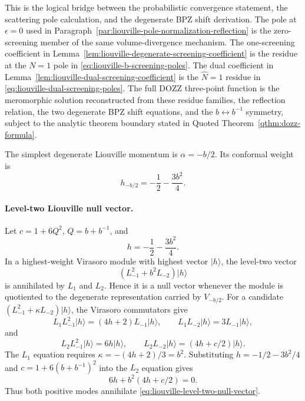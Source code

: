 This is the logical bridge between the probabilistic convergence statement,
the scattering pole calculation, and the degenerate BPZ shift derivation.
The pole at \(\epsilon=0\) used in
Paragraph~\ref{par:liouville-pole-normalization-reflection} is the
zero-screening member of the same volume-divergence mechanism.  The
one-screening coefficient in
Lemma~\ref{lem:liouville-degenerate-screening-coefficient} is the residue at
the \(N=1\) pole in \eqref{eq:liouville-b-screening-poles}.  The dual
coefficient in Lemma~\ref{lem:liouville-dual-screening-coefficient} is the
\(\widehat N=1\) residue in
\eqref{eq:liouville-dual-screening-poles}.  The full DOZZ three-point
function is the meromorphic solution reconstructed from these residue
families, the reflection relation, the two degenerate BPZ shift equations,
and the \(b\leftrightarrow b^{-1}\) symmetry, subject to the analytic
theorem boundary stated in
Quoted Theorem~\ref{qthm:dozz-formula}.

The simplest degenerate Liouville momentum is \(\alpha=-b/2\).  Its conformal
weight is
\[
  h_{-b/2}
  =
  -\frac12-\frac{3b^2}{4}.
\]

\paragraph{Level-two Liouville null vector.}
Let \(c=1+6Q^2\), \(Q=b+b^{-1}\), and
\[
  h=-\frac12-\frac{3b^2}{4}.
\]
In a highest-weight Virasoro module with highest vector \(|h\rangle\), the
level-two vector
\begin{equation}
  \left(L_{-1}^2+b^2L_{-2}\right)|h\rangle
  \label{eq:liouville-level-two-null-vector}
\end{equation}
is annihilated by \(L_1\) and \(L_2\).  Hence it is a null vector whenever the
module is quotiented to the degenerate representation carried by
\(V_{-b/2}\).
For a candidate \((L_{-1}^2+\kappa L_{-2})|h\rangle\), the Virasoro
commutators give
\[
  L_1L_{-1}^2|h\rangle=(4h+2)L_{-1}|h\rangle,
  \qquad
  L_1L_{-2}|h\rangle=3L_{-1}|h\rangle,
\]
and
\[
  L_2L_{-1}^2|h\rangle=6h|h\rangle,
  \qquad
  L_2L_{-2}|h\rangle=(4h+c/2)|h\rangle .
\]
The \(L_1\) equation requires
\(\kappa=-(4h+2)/3=b^2\).  Substituting
\(h=-1/2-3b^2/4\) and \(c=1+6(b+b^{-1})^2\) into the \(L_2\) equation gives
\[
  6h+b^2(4h+c/2)=0.
\]
Thus both positive modes annihilate \eqref{eq:liouville-level-two-null-vector}.

